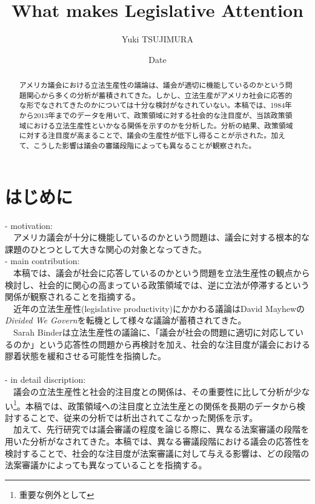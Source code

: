 \documentclass[here]{article}
\title{What makes Legislative Attention}
\author{Yuki TSUJIMURA}
\date{Date}
\begin{document}
\maketitle

\begin{abstract}
アメリカ議会における立法生産性の議論は、議会が適切に機能しているのかという問題関心から多くの分析が蓄積されてきた。しかし、立法生産がアメリカ社会に応答的な形でなされてきたのかについては十分な検討がなされていない。本稿では、1984年から2013年までのデータを用いて、政策領域に対する社会的な注目度が、当該政策領域における立法生産性といかなる関係を示すのかを分析した。分析の結果、政策領域に対する注目度が高まることで、議会の生産性が低下し得ることが示された。加えて、こうした影響は議会の審議段階によっても異なることが観察された。
\end{abstract}


\section{はじめに}
- motivation: 
\\
　アメリカ議会が十分に機能しているのかという問題は、議会に対する根本的な課題のひとつとして大きな関心の対象となってきた。\\
- main contribution: 
\\
　本稿では、議会が社会に応答しているのかという問題を立法生産性の観点から検討し、社会的に関心の高まっている政策領域では、逆に立法が停滞するという関係が観察されることを指摘する。\\
　近年の立法生産性(legislative productivity)にかかわる議論はDavid Mayhewの\textit{Divided We Govern}を転機として様々な議論が蓄積されてきた。\\
　Sarah Binderは立法生産性の議論に、「議会が社会の問題に適切に対応しているのか」という応答性の問題から再検討を加え、社会的な注目度が議会における膠着状態を緩和させる可能性を指摘した。\citep*{Binder2003-bn}\\
\\
- in detail discription:
\\
　議会の立法生産性と社会的注目度との関係は、その重要性に比して分析が少ない\footnote{重要な例外として\citet*{Adler2013-ay}}。本稿では、政策領域への注目度と立法生産との関係を長期のデータから検討することで、従来の分析では析出されてこなかった関係を示す。\\
　加えて、先行研究では議会審議の程度を論じる際に、異なる法案審議の段階を用いた分析がなされてきた。本稿では、異なる審議段階における議会の応答性を検討することで、社会的な注目度が法案審議に対して与える影響は、どの段階の法案審議かによっても異なっていることを指摘する。\\
\end{document}
